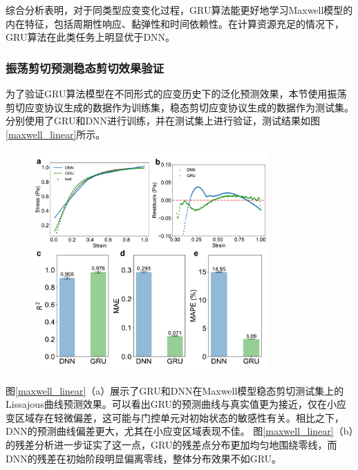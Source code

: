 综合分析表明，对于同类型应变变化过程，GRU算法能更好地学习Maxwell模型的内在特征，包括周期性响应、黏弹性和时间依赖性。在计算资源充足的情况下，GRU算法在此类任务上明显优于DNN。


\subsubsection{振荡剪切预测稳态剪切效果验证}

为了验证GRU算法模型在不同形式的应变历史下的泛化预测效果，本节使用振荡剪切应变协议生成的数据作为训练集，稳态剪切应变协议生成的数据作为测试集。分别使用了GRU和DNN进行训练，并在测试集上进行验证，测试结果如图\ref{maxwell_linear}所示。
\begin{figure}[htbp]
  \centering
  \includegraphics[width=0.8\textwidth]{Fig/maxwell_linear_test.pdf}
\end{figure}

图\ref{maxwell_linear}（a）展示了GRU和DNN在Maxwell模型稳态剪切测试集上的Lissajous曲线预测效果。可以看出GRU的预测曲线与真实值更为接近，仅在小应变区域存在轻微偏差，这可能与门控单元对初始状态的敏感性有关。相比之下，DNN的预测曲线偏差更大，尤其在小应变区域表现不佳。
图\ref{maxwell_linear}（b）的残差分析进一步证实了这一点，GRU的残差点分布更加均匀地围绕零线，而DNN的残差在初始阶段明显偏离零线，整体分布效果不如GRU。

